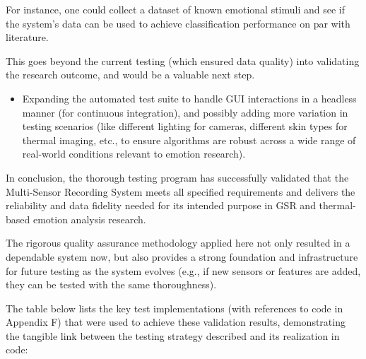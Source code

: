 {{{{{{{For instance, one could collect a dataset of known emotional stimuli and see if the
system's data can be used to achieve classification performance on par with
literature.

This goes beyond the current testing (which ensured data quality) into validating the
research outcome, and would be a valuable next step.

\begin{itemize}

\item Expanding the automated test suite to handle GUI interactions in a headless manner (for continuous integration), and possibly adding more variation in testing scenarios (like different lighting for cameras, different skin types for thermal imaging, etc., to ensure algorithms are robust across a wide range of real-world conditions relevant to emotion research).

\end{itemize}

In conclusion, the thorough testing program has successfully validated that the
Multi-Sensor Recording System meets all specified requirements and delivers the
reliability and data fidelity needed for its intended purpose in GSR and
thermal-based emotion analysis research.

The rigorous quality assurance methodology applied here not only resulted in a
dependable system now, but also provides a strong foundation and infrastructure for
future testing as the system evolves (e.g., if new sensors or features are added,
they can be tested with the same thoroughness).

The table below lists the key test implementations (with references to code in
Appendix F) that were used to achieve these validation results, demonstrating the
tangible link between the testing strategy described and its realization in code:
\begin{itemize}


\end{itemize}}}}}}}}
